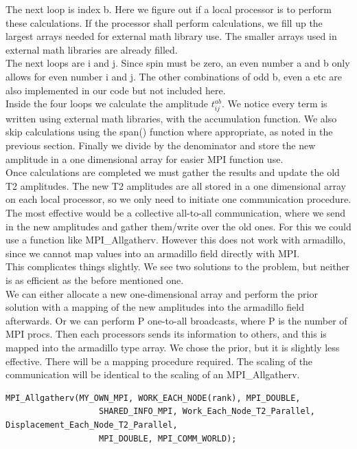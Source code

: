 \documentclass[a4paper,norsk,11pt,twoside]{report}
\begin{document}
The next loop is index b. Here we figure out if a local processor is to perform these calculations. If the processor shall perform calculations, we fill up the largest arrays needed for external math library use. The smaller arrays used in external math libraries are already filled. \\

The next loops are i and j. Since spin must be zero, an even number a and b only allows for even number i and j. The other combinations of odd b, even a etc are also implemented in our code but not included here. \\

Inside the four loops we calculate the amplitude $t_{ij}^{ab}$. We notice every term is written using external math libraries, with the accumulation function. We also skip calculations using the span() function where appropriate, as noted in the previous section. Finally we divide by the denominator and store the new amplitude in a one dimensional array for easier MPI function use. \\

Once calculations are completed we must gather the results and update the old T2 amplitudes. The new T2 amplitudes are all stored in a one dimensional array on each local processor, so we only need to initiate one communication procedure. The most effective would be a collective all-to-all communication, where we send in the new amplitudes and gather them/write over the old ones. For this we could use a function like MPI\_Allgatherv. However this does not work with armadillo, since we cannot map values into an armadillo field directly with MPI. \\

This complicates things slightly. We see two solutions to the problem, but neither is as efficient as the before mentioned one. \\

We can either allocate a new one-dimensional array and perform the prior solution with a mapping of the new amplitudes into the armadillo field afterwards. Or we can perform P one-to-all broadcasts, where P is the number of MPI procs. Then each processors sends its information to others, and this is mapped into the armadillo type array. We chose the prior, but it is slightly less effective. There will be a mapping procedure required. The scaling of the communication will be identical to the scaling of an MPI\_Allgatherv.

\begin{lstlisting}
MPI_Allgatherv(MY_OWN_MPI, WORK_EACH_NODE(rank), MPI_DOUBLE,
                   SHARED_INFO_MPI, Work_Each_Node_T2_Parallel, Displacement_Each_Node_T2_Parallel,
                   MPI_DOUBLE, MPI_COMM_WORLD);
\end{lstlisting}
\end{document}
